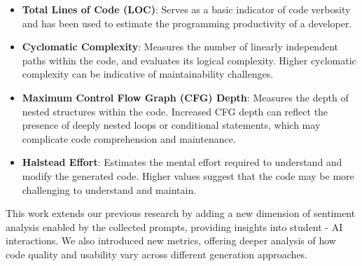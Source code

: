 \begin{itemize} 
\item \textbf{Total Lines of Code (LOC)}: Serves as a basic indicator of code verbosity and has been used to estimate the programming productivity of a developer.

\item \textbf{Cyclomatic Complexity}: Measures the number of linearly independent paths within the code, and evaluates its logical complexity. Higher cyclomatic complexity can be indicative of maintainability challenges.

\item \textbf{Maximum Control Flow Graph (CFG) Depth}: Measures the depth of nested structures within the code. Increased CFG depth can reflect the presence of deeply nested loops or conditional statements, which may complicate code comprehension and maintenance.

\item \textbf{Halstead Effort}: Estimates the mental effort required to understand and modify the generated code. Higher values suggest that the code may be more challenging to understand and maintain.
\end{itemize}

This work extends our previous research \cite{Rasnayaka2024} by adding a new dimension of sentiment analysis enabled by the collected prompts, providing insights into student - AI interactions. We also introduced new metrics, offering deeper analysis of how code quality and usability vary across different generation approaches.


